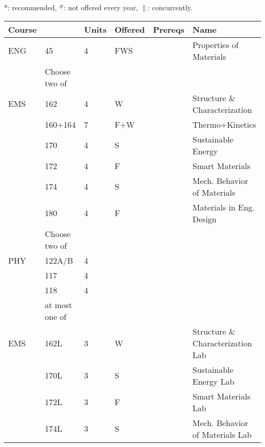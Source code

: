 \documentclass[12pt]{article}
\begin{document}
\newpage
{}
\vskip 0.25cm
\noindent
*: recommended, $^\#$: not offered every year, $\parallel$: concurrently.\\
\begin{tabular}{|llllll|}
\hline
Course & & Units & Offered & Prereqs & Name \\
\hline
ENG & 45     & 4 & FWS & & Properties of Materials \\
\hline
\hline
    & Choose two of & & & & \\
\hline
EMS & 162     & 4 & W & & Structure \& Characterization \\
    & 160+164 & 7 & F+W & & Thermo+Kinetics \\
    & 170     & 4 & S & & Sustainable Energy \\ 
    & 172     & 4 & F & & Smart Materials \\
    & 174     & 4 & S & & Mech. Behavior of Materials\\
    & 180     & 4 & F & & Materials in Eng. Design\\
\hline
\hline
    & Choose two of & & & & \\
\hline
PHY & 122A/B & 4 & & & \\
    & 117   & 4 & & & \\
    & 118   & 4 & & & \\
    & at most one of & & & & \\
EMS & 162L   & 3 & W & & Structure \& Characterization Lab\\
    & 170L   & 3 & S & & Sustainable Energy Lab \\
    & 172L   & 3 & F & & Smart Materials Lab \\
    & 174L   & 3 & S & & Mech. Behavior of Materials Lab \\
\hline
\end{tabular}\\







\newpage
\end{document}

